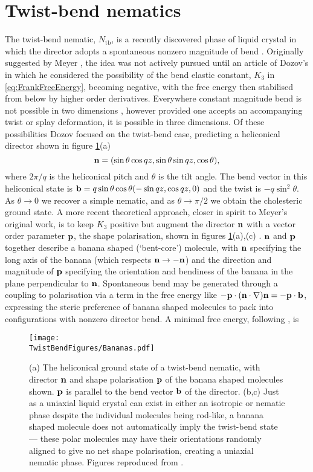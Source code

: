 \section{Twist-bend nematics} 
\label{sec:TwistBendNematics}
The twist-bend nematic, $N_{\mathrm{tb}}$, is a recently discovered phase of liquid crystal in which the director adopts a spontaneous nonzero magnitude of bend \citep{Lavrentovich2018}. Originally suggested by Meyer \citep{Meyer1976}, the idea was not actively pursued until an article of Dozov's \citep{Dozov2001} in which he considered the possibility of the bend elastic constant, $K_3$ in \eqref{eq:FrankFreeEnergy}, becoming negative, with the free energy then stabilised from below by higher order derivatives. Everywhere constant magnitude bend is not possible in two dimensions \citep{Niv2018}, however provided one accepts an accompanying twist or splay deformation, it is possible in three dimensions. Of these possibilities Dozov focused on the twist-bend case, predicting a heliconical director shown in figure \ref{fig:Bananas}(a)
\begin{equation}
\mathbf{n} = (\sin \theta \cos q z, \sin \theta \sin q z , \cos \theta),
\label{eq:TwistBendDirector}
\end{equation}
where $2\pi/q$ is the heliconical pitch and $\theta$ is the tilt angle. The bend vector in this heliconical state is $\mathbf{b} = q\sin \theta \cos\theta (-\sin q z, \cos q z, 0)$ and the twist is $- q \sin^2 \theta$. As $\theta \rightarrow 0$ we recover a simple nematic, and as $\theta \rightarrow \pi/2$ we obtain the cholesteric ground state. A more recent theoretical approach, closer in spirit to Meyer's original work, is to keep $K_3$ positive but augment the director $\mathbf{n}$ with a vector order parameter $\mathbf{p}$, the shape polarisation, shown in figures \ref{fig:Bananas}(a),(c) \citep{Shamid2013}. $\mathbf{n}$ and $\mathbf{p}$ together describe a banana shaped (`bent-core') molecule, with $\mathbf{n}$ specifying the long axis of the banana (which respects $\mathbf{n} \rightarrow -\mathbf{n}$) and the direction and magnitude of $\mathbf{p}$ specifying the orientation and bendiness of the banana in the plane perpendicular to $\mathbf{n}$. Spontaneous bend may be generated through a coupling to polarisation via a term in the free energy like $-\mathbf{p} \cdot (\mathbf{n} \cdot \nabla) \mathbf{n}=- \mathbf{p} \cdot \mathbf{b}$, expressing the steric preference of banana shaped molecules to pack into configurations with nonzero director bend. A minimal free energy, following \citep{Shamid2013}, is
\begin{figure}[htbp]
    \centering
    \texttt{[image: \\TwistBendFigures/Bananas.pdf]}
    \caption[Twist-bend nematics.]{(a) The heliconical ground state of a twist-bend nematic, with director $\mathbf{n}$ and shape polarisation $\mathbf{p}$ of the banana shaped molecules shown. $\mathbf{p}$ is parallel to the bend vector $\mathbf{b}$ of the director. (b,c) Just as a uniaxial liquid crystal can exist in either an isotropic or nematic phase despite the individual molecules being rod-like, a banana shaped molecule does not automatically imply the twist-bend state --- these polar molecules may have their orientations randomly aligned to give no net shape polarisation, creating a uniaxial nematic phase. Figures reproduced from \citep{Lavrentovich2018}.}
    \label{fig:Bananas}
\end{figure}
